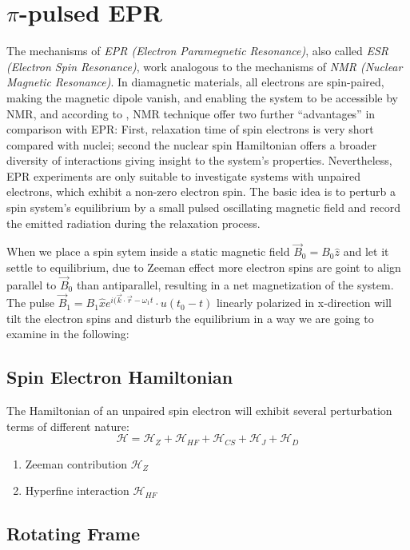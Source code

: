 \documentclass[11.5pt,a4paper]{article}
\begin{document}
\section{$\pi$-pulsed EPR}
The mechanisms of \emph{EPR (Electron Paramegnetic Resonance)}, also called \emph{ESR (Electron Spin Resonance)}, work analogous to the mechanisms of \emph{NMR (Nuclear Magnetic Resonance)}. In diamagnetic materials, all electrons are spin-paired, making the magnetic dipole vanish, and enabling the system to be accessible by NMR, and according to \cite[Chap. 4, p. 107]{nmr-ox}, NMR technique offer two further ``advantages'' in comparison with EPR: First, relaxation time of spin electrons is very short compared with nuclei; second the nuclear spin Hamiltonian offers a broader diversity of interactions giving insight to the system's properties. Nevertheless, EPR experiments are only suitable to investigate systems with unpaired electrons, which exhibit a non-zero electron spin. The basic idea is to perturb a spin system's equilibrium by a small pulsed oscillating magnetic field and record the emitted radiation during the relaxation process. 

When we place a spin sytem inside a static magnetic field $\vec{B}_0 = B_0 \hat{z}$ and let it settle to equilibrium, due to Zeeman effect more electron spins are goint to align parallel to $\vec{B}_0$ than antiparallel, resulting in a net magnetization of the system. The pulse $\vec{B}_1 = B_1 \hat{x} e^{i(\vec{k}\cdot\vec{r}-\omega_1 t} \cdot u(t_0-t)$ linearly polarized in x-direction will tilt the electron spins and disturb the equilibrium in a way we are going to examine in the following:

\subsection{Spin Electron Hamiltonian}
The Hamiltonian of an unpaired spin electron will exhibit several perturbation terms of different nature:
\begin{equation}
 \mathcal{H} = \mathcal{H}_Z + \mathcal{H}_{HF} + \mathcal{H}_{CS} + \mathcal{H}_J + \mathcal{H}_D
\end{equation}
\begin{enumerate}
  \item Zeeman contribution $\mathcal{H}_Z$
  \item Hyperfine interaction $\mathcal{H}_{HF}$
\end{enumerate}

\subsection{Rotating Frame}
\end{document}
